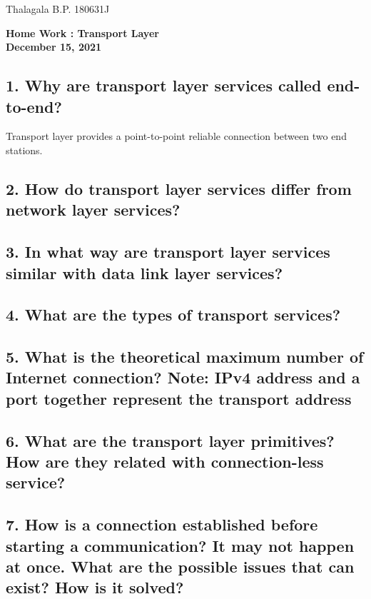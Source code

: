 \documentclass[a4paper,11pt]{article}
\begin{document}
	Thalagala B.P. 180631J
\begin{center}
{	\Large\textbf{Home Work : Transport Layer}}\\[2mm]

\textbf{December 15, 2021}
\end{center}


\subsection*{1. Why are transport layer services called end-to-end?}

Transport layer provides a point-to-point reliable connection between two end stations. 

\subsection*{2. How do transport layer services differ from network layer services?}


\subsection*{3. In what way are transport layer services similar with data link layer services?}


\subsection*{4. What are the types of transport services?}


\subsection*{5. What is the theoretical maximum number of Internet connection?    Note: IPv4 address and a port together represent the transport address}


\subsection*{6. What are the transport layer primitives? How are they related with connection-less service?}


\subsection*{7. How is a connection established before starting a communication? It may not happen at once. What are the possible issues that can exist? How is it solved?}
\end{document}
